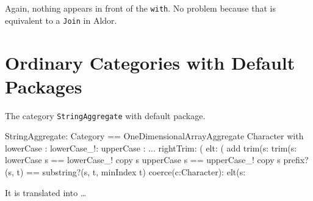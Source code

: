 \documentclass{article}
\begin{document}
  Again, nothing appears in front of the \verb'with'. No problem
  because that is equivalent to a \verb'Join' in Aldor.


















\section{Ordinary Categories with Default Packages}
\label{sec:Category+Default}
The category \verb'StringAggregate' with default package.
\begin{code}
StringAggregate: Category == OneDimensionalArrayAggregate Character with
    lowerCase       : %
    lowerCase_!: %
    upperCase       : %
    ...
    rightTrim: (%
    elt: (%
 add
   trim(s: %
   trim(s: %
   lowerCase s           == lowerCase_! copy s
   upperCase s           == upperCase_! copy s
   prefix?(s, t)         == substring?(s, t, minIndex t)
   coerce(c:Character):%
   elt(s:%
\end{code}
It is translated into \ldots
\end{document}
